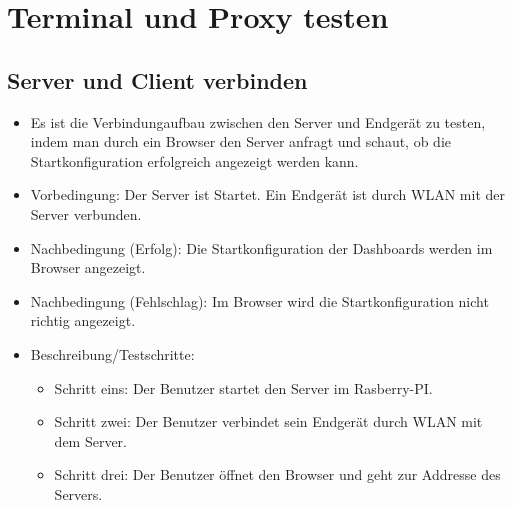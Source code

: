 \documentclass[qualitaetssicherung.tex]{subfiles}
\begin{document}
\section{Terminal und Proxy testen}

	\subsection{Server und Client verbinden}
		\begin{itemize}
			\item
			Es ist die Verbindungaufbau zwischen den Server und Endgerät zu testen, indem
			man durch ein Browser den Server anfragt und schaut, ob die
			Startkonfiguration erfolgreich angezeigt werden kann.
			\item
			Vorbedingung: Der Server ist Startet. Ein Endgerät ist durch WLAN mit der
			Server verbunden.
			\item
			Nachbedingung (Erfolg): Die Startkonfiguration der Dashboards werden im
			Browser angezeigt.
			\item
			Nachbedingung (Fehlschlag): Im Browser wird die Startkonfiguration nicht
			richtig angezeigt.
			\item
			Beschreibung/Testschritte:
			\begin{itemize}
				\item
				Schritt eins: Der Benutzer startet den Server im Rasberry-PI.
				\item
				Schritt zwei: Der Benutzer verbindet sein Endgerät durch WLAN mit dem
				Server.
				\item  
				Schritt drei: Der Benutzer öffnet den Browser und geht zur Addresse des
				Servers.
			\end{itemize}
		\end{itemize}
		
\end{document}
